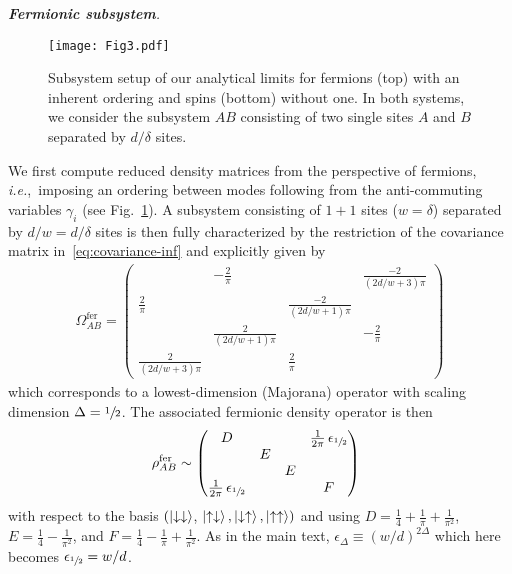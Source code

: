 \documentclass[prl,a4paper,notitlepage,twocolumn,superscriptaddress,longbibliography,reprint]{revtex4-2}
\newcommand{\ie}{{\it i.e.},\ }
\newcommand{\mysection}[1]{{\vspace{10 pt}\noindent \emph{{\textbf{#1}}.}}}
\begin{document}
\mysection{Fermionic subsystem}
\begin{figure}
    \centering
    \texttt{[image: Fig3.pdf]}
    \caption{Subsystem setup of our analytical limits for fermions (top) with an inherent ordering and spins (bottom) without one. In both systems, we consider the subsystem $AB$ consisting of two single sites $A$ and $B$ separated by $d/\delta$ sites.
    }
    \label{fig:1+1subsystem}
\end{figure}
We first compute reduced density matrices from the perspective of fermions, \ie imposing an ordering between modes following from the anti-commuting variables $\gamma_i$ (see Fig.~\ref{fig:1+1subsystem}). A subsystem consisting of $1+1$ sites ($w=\delta$) separated by $d/w=d/\delta$ sites is then fully characterized by the restriction of the covariance matrix in~\eqref{eq:covariance-inf} and explicitly given by
\begin{align}
    \Omega^{\mathrm{fer}}_{AB} = 
    \begin{pmatrix}
      & -\frac{2}{\pi } &  & \frac{-2}{(2 d/w+3) \pi } \\
     \frac{2}{\pi } &  & \frac{-2}{(2 d/w+1) \pi } &  \\
      & \frac{2}{(2 d/w+1) \pi } &  & -\frac{2}{\pi } \\
     \frac{2}{(2 d/w+3) \pi } &  & \frac{2}{\pi } &  
    \end{pmatrix}\label{eq:omega-fermions}
\end{align}
which corresponds to a lowest-dimension (Majorana) operator with scaling dimension $\Delta=\sfrac{1}{2}$. The associated fermionic density operator is then
\begin{align}\label{eq:rho-fermions}
    \hspace{-2mm}\rho^{\mathrm{fer}}_{AB}\sim\begin{pmatrix}
     D & & &\frac{1}{2\pi}\,\epsilon_{\sfrac{1}{2}}\\
     & E & & \\
     & & E & \\
     \frac{1}{2\pi}\,\epsilon_{\sfrac{1}{2}} & & & F
    \end{pmatrix}
\end{align}
with respect to the basis $(\ket{\downarrow\downarrow}$, $\ket{\uparrow\downarrow},\ket{\downarrow\uparrow},\ket{\uparrow\uparrow})$ and using $D=\frac{1}{4}+\frac{1}{\pi}+\frac{1}{\pi^2}$, $E=\frac{1}{4}-\frac{1}{\pi^2}$, and $F=\frac{1}{4}-\frac{1}{\pi}+\frac{1}{\pi^2}$.
As in the main text, $\epsilon_\Delta \equiv (w/d)^{2\Delta}$ which here becomes $\epsilon_{\sfrac{1}{2}}=w/d$.
\end{document}
